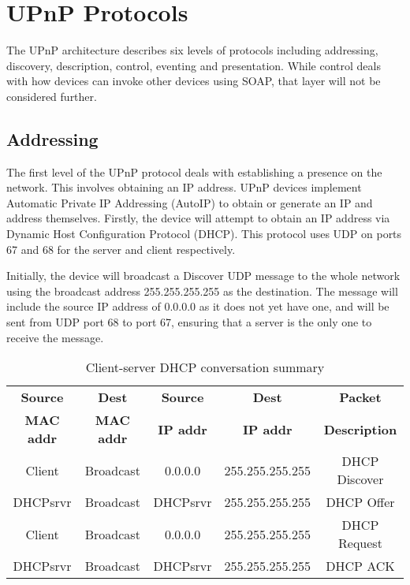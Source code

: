 \section{UPnP Protocols}

The UPnP architecture describes six levels of protocols including addressing, discovery, description, control, eventing and presentation. While control deals with how devices can invoke other devices using SOAP, that layer will not be considered further.

\subsection{Addressing}

The first level of the UPnP protocol deals with establishing a presence on the network. This involves obtaining an IP address. UPnP devices implement Automatic Private IP Addressing (AutoIP) to obtain or generate an IP and address themselves. Firstly, the device will attempt to obtain an IP address via Dynamic Host Configuration Protocol (DHCP)\cite{UPnPWindowsXP}. This protocol uses UDP on ports 67 and 68 for the server and client respectively.

Initially, the device will broadcast a Discover UDP message to the whole network using the broadcast address 255.255.255.255 as the destination. The message will include the source IP address of 0.0.0.0 as it does not yet have one, and will be sent from UDP port 68 to port 67, ensuring that a server is the only one to receive the message.

\begin{center}
\begin{table}[h!]
\begin{tabular}{|c|c|c|c|c|}
	\hline 
	\textbf{Source}&\textbf{Dest}&\textbf{Source}&\textbf{Dest}&\textbf{Packet} \\
	\textbf{MAC addr}&\textbf{MAC addr}&\textbf{IP addr}&\textbf{IP addr}&\textbf{Description} \\
	\hline
	Client&Broadcast&0.0.0.0&255.255.255.255&DHCP Discover \\
	\hline
   DHCPsrvr&Broadcast&DHCPsrvr&255.255.255.255&DHCP Offer \\
   \hline
   Client&Broadcast&0.0.0.0&255.255.255.255&DHCP Request \\
   \hline
   DHCPsrvr&Broadcast&DHCPsrvr&255.255.255.255&DHCP ACK \\
   \hline
\end{tabular}

\caption{Client-server DHCP conversation summary\cite{microsoft-dhcp}} 
\label{table:1}
\end{table}
\end{center}

